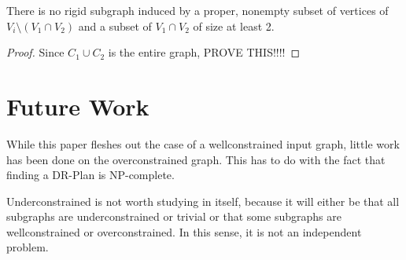 \documentclass[11pt]{article}
\begin{document}



\begin{corollary}
There is no rigid subgraph induced by a proper, nonempty subset of vertices of $V_i \setminus (V_1\cap V_2)$ and a subset of $V_1\cap V_2$ of size at least 2.
\end{corollary}

\begin{proof}
Since $C_1\cup C_2$ is the entire graph, PROVE THIS!!!!
\end{proof}









\section{Future Work}
While this paper fleshes out the case of a wellconstrained input graph, little work has been done on the overconstrained graph. This has to do with the fact that finding a DR-Plan is NP-complete.

Underconstrained is not worth studying in itself, because it will either be that all subgraphs are underconstrained or trivial or that some subgraphs are wellconstrained or overconstrained. In this sense, it is not an independent problem.
\end{document}
